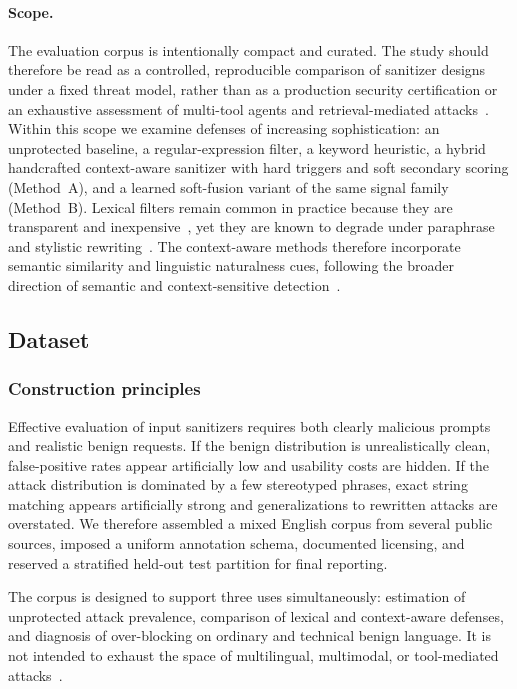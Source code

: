 ﻿\documentclass[10pt]{article}
\begin{document}
\paragraph{Scope.}
The evaluation corpus is intentionally compact and curated.
The study should therefore be read as a controlled, reproducible comparison of sanitizer designs under a fixed threat model, rather than as a production security certification or an exhaustive assessment of multi-tool agents and retrieval-mediated attacks~\cite{debenedetti2024agentdojo,greshake2023indirect}.
Within this scope we examine defenses of increasing sophistication: an unprotected baseline, a regular-expression filter, a keyword heuristic, a hybrid handcrafted context-aware sanitizer with hard triggers and soft secondary scoring (Method~A), and a learned soft-fusion variant of the same signal family (Method~B).
Lexical filters remain common in practice because they are transparent and inexpensive~\cite{openrouter2026promptinjection,getstream2024prompt,mend2024prompt}, yet they are known to degrade under paraphrase and stylistic rewriting~\cite{yi2024jailbreak,wang2025promptsleuth}.
The context-aware methods therefore incorporate semantic similarity and linguistic naturalness cues, following the broader direction of semantic and context-sensitive detection~\cite{wang2025promptsleuth,kholkar2025capture,bair2025prompt}.

\subsection{Dataset}
\label{sec:dataset}

\subsubsection{Construction principles}

Effective evaluation of input sanitizers requires both clearly malicious prompts and realistic benign requests.
If the benign distribution is unrealistically clean, false-positive rates appear artificially low and usability costs are hidden.
If the attack distribution is dominated by a few stereotyped phrases, exact string matching appears artificially strong and generalizations to rewritten attacks are overstated.
We therefore assembled a mixed English corpus from several public sources, imposed a uniform annotation schema, documented licensing, and reserved a stratified held-out test partition for final reporting.

The corpus is designed to support three uses simultaneously: estimation of unprotected attack prevalence, comparison of lexical and context-aware defenses, and diagnosis of over-blocking on ordinary and technical benign language.
It is not intended to exhaust the space of multilingual, multimodal, or tool-mediated attacks~\cite{yeo2025multimodal,debenedetti2024agentdojo}.
\end{document}

